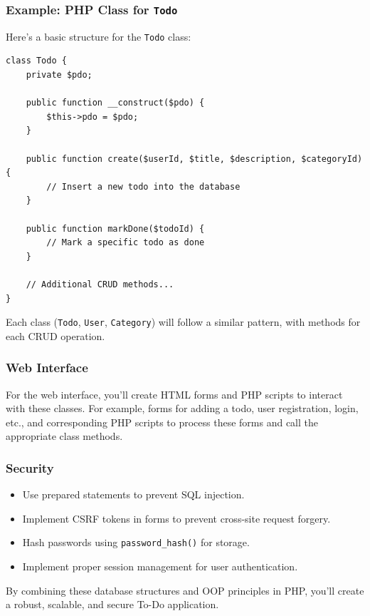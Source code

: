 \documentclass[11pt]{article}
\begin{document}
\subsubsection{Example: PHP Class for \texttt{Todo}}
\label{sec:org97d89a6}
Here's a basic structure for the \texttt{Todo} class:

\begin{verbatim}
class Todo {
    private $pdo;

    public function __construct($pdo) {
        $this->pdo = $pdo;
    }

    public function create($userId, $title, $description, $categoryId) {
        // Insert a new todo into the database
    }

    public function markDone($todoId) {
        // Mark a specific todo as done
    }

    // Additional CRUD methods...
}
\end{verbatim}

Each class (\texttt{Todo}, \texttt{User}, \texttt{Category}) will follow a similar pattern,
with methods for each CRUD operation.

\subsubsection{Web Interface}
\label{sec:org1b1f087}
For the web interface, you'll create HTML forms and PHP scripts to
interact with these classes. For example, forms for adding a todo, user
registration, login, etc., and corresponding PHP scripts to process
these forms and call the appropriate class methods.

\subsubsection{Security}
\label{sec:org215c65e}
\begin{itemize}
\item Use prepared statements to prevent SQL injection.
\item Implement CSRF tokens in forms to prevent cross-site request forgery.
\item Hash passwords using \texttt{password\_hash()} for storage.
\item Implement proper session management for user authentication.
\end{itemize}

By combining these database structures and OOP principles in PHP, you'll
create a robust, scalable, and secure To-Do application.
\end{document}
